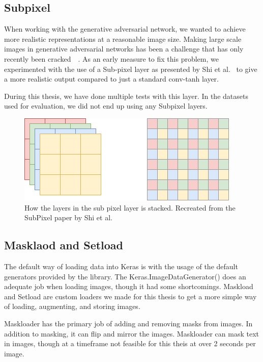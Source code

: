 \subsection{Subpixel}
When working with the generative adversarial network, we wanted to achieve more realistic representations at a reasonable image size. 
Making large scale images in generative adversarial networks has been a challenge that has only recently been cracked~\cite{DBLP:journals/corr/DentonCSF15}~\cite{DBLP:journals/corr/abs-1809-11096}.
As an early measure to fix this problem, we experimented with the use of a Sub-pixel layer as presented by Shi et al.~\cite{DBLP:journals/corr/ShiCHTABRW16} to give a more realistic output compared to just a standard conv-tanh layer.

During this thesis, we have done multiple tests with this layer. In the datasets used for evaluation, we did not end up using any Subpixel layers.

\begin{figure}
\centering
\includegraphics[scale=0.8]{methodology/figures/SubPixel.png}
\caption{How the layers in the sub pixel layer is stacked. Recreated from the SubPixel paper by Shi et al.~\cite{DBLP:journals/corr/ShiCHTABRW16}}
\label{fig:SubPixel}
\end{figure}


\subsection{Masklaod and Setload}
The default way of loading data into Keras is with the usage of the default generators provided by the library. The Keras.ImageDataGenerator() does an adequate job when loading images, though it had some shortcomings.
Maskload and Setload are custom loaders we made for this thesis to get a more simple way of loading, augmenting, and storing images.

Maskloader has the primary job of adding and removing masks from images. In addition to masking, it can flip and mirror the images. Maskloader can mask text in images, though at a timeframe not feasible for this theis at over 2 seconds per image. 


